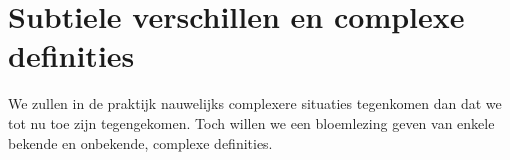 

\section{Subtiele verschillen en complexe definities}
We zullen in de praktijk nauwelijks complexere situaties tegenkomen dan dat we tot nu toe zijn tegengekomen. Toch willen we een bloemlezing geven van enkele bekende en onbekende, complexe definities.

